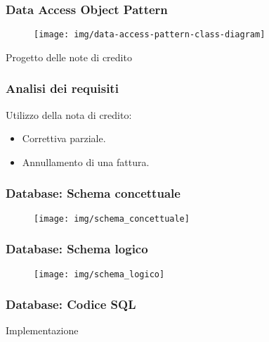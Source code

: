 \documentclass[]{beamer}
\begin{document}
    \begin{frame}
        \frametitle{Data Access Object Pattern}
        \begin{figure}[H]
             \centering
             \texttt{[image: img/data-access-pattern-class-diagram]}\label{pattern:dao}
         \end{figure}
    \end{frame}

    \begin{frame}
        \begin{center}
            \Huge Progetto delle note di credito    
        \end{center}
    \end{frame}

    \begin{frame}
        \frametitle{Analisi dei requisiti}
        Utilizzo della nota di credito:
        \begin{itemize}
            \item Correttiva parziale.
            \item Annullamento di una fattura.
        \end{itemize}
    \end{frame}

    \begin{frame}
        \frametitle{Database: Schema concettuale}
        \begin{figure}[H]
            \centering
            \texttt{[image: img/schema\_concettuale]}\label{schema:concettuale}
        \end{figure}
    \end{frame}

    \begin{frame}
        \frametitle{Database: Schema logico}
        \begin{figure}[H]
            \centering
            \texttt{[image: img/schema\_logico]}\label{schema:logico}
        \end{figure}
    \end{frame}

    \begin{frame}
        \frametitle{Database: Codice SQL}
        
    \end{frame}

    \begin{frame}
        \begin{center}
            \Huge Implementazione 
        \end{center}
    \end{frame}
\end{document}
